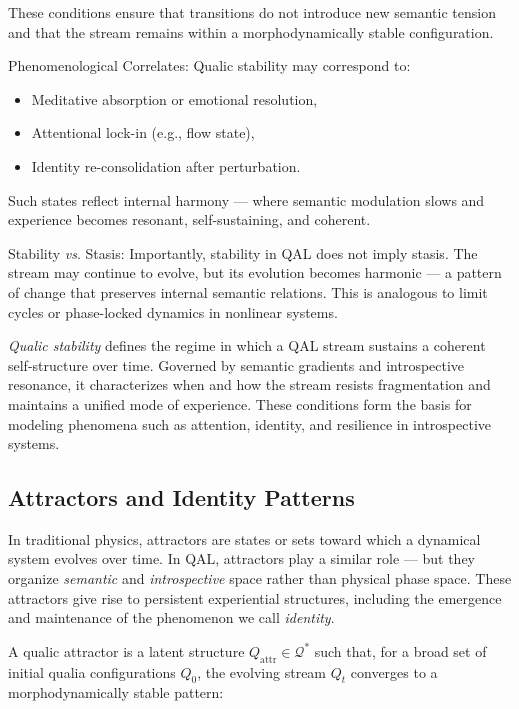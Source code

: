 \documentclass[11pt]{article}
\numberwithin{equation}{section} %
\begin{document}
These conditions ensure that transitions do not introduce new semantic tension and that the stream remains within a morphodynamically stable configuration.

\bigskip

Phenomenological Correlates:
Qualic stability may correspond to:
\begin{itemize}
  \item Meditative absorption or emotional resolution,
  \item Attentional lock-in (e.g., flow state),
  \item Identity re-consolidation after perturbation.
\end{itemize}

Such states reflect internal harmony — where semantic modulation slows and experience becomes resonant, self-sustaining, and coherent.

\bigskip

\noindent Stability \textit{vs}. Stasis:  
Importantly, stability in QAL does not imply stasis. The stream may continue to evolve, but its evolution becomes harmonic — a pattern of change that preserves internal semantic relations. This is analogous to limit cycles or phase-locked dynamics in nonlinear systems.

\textit{Qualic stability} defines the regime in which a QAL stream sustains a coherent self-structure over time. Governed by semantic gradients and introspective resonance, it characterizes when and how the stream resists fragmentation and maintains a unified mode of experience. These conditions form the basis for modeling phenomena such as attention, identity, and resilience in introspective systems.


\subsection{Attractors and Identity Patterns}

In traditional physics, attractors are states or sets toward which a dynamical system evolves over time. In QAL, attractors play a similar role — but they organize \textit{semantic} and \textit{introspective} space rather than physical phase space. These attractors give rise to persistent experiential structures, including the emergence and maintenance of the phenomenon we call \textit{identity}.

\bigskip

\noindent A qualic attractor is a latent structure \( Q_{\text{attr}} \in \mathcal{Q}^* \) such that, for a broad set of initial qualia configurations \( Q_0 \), the evolving stream \( Q_t \) converges to a morphodynamically stable pattern:
\end{document}
